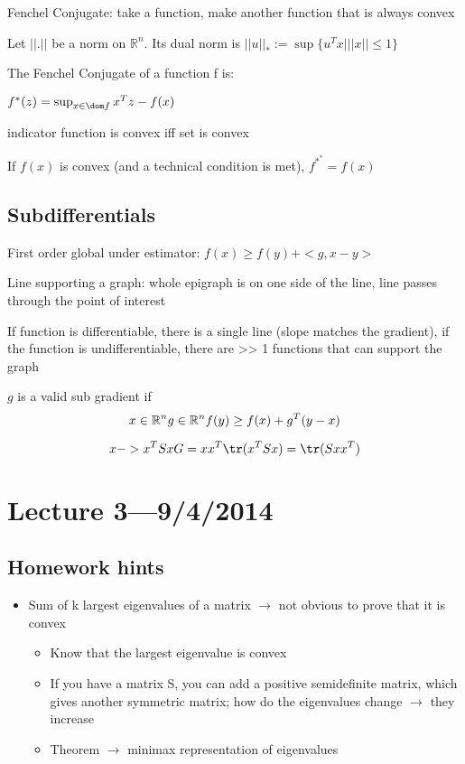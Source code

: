 \documentclass[10pt]{article}
\begin{document}
Fenchel Conjugate: take a function, make another function that is always convex

Let $||.||$ be a norm on $\mathbb{R}^n$. Its dual norm is $||u||_* := \sup \{ u^Tx | ||x|| \le 1 \}$

The Fenchel Conjugate of a function f is:

$f^*(z) = \sup_{x \in \dom f} x^T z - f(x)$

indicator function is convex iff set is convex

If $f(x)$ is convex (and a technical condition is met), $f^*^* = f(x)$

\subsection{Subdifferentials}

First order global under estimator: $f(x) \ge f(y) + <g, x - y>$

Line supporting a graph: whole epigraph is on one side of the line, line passes through the point of interest

If function is differentiable, there is a single line (slope matches the gradient), if the function is undifferentiable, there are >> 1 functions that can support the graph

$g$ is a valid sub gradient if 
$$
x \in \mathbb{R}^n \\
g \in \mathbb{R}^n \\
f(y) \ge f(x) + g^T(y - x)
$$

$$
x -> x^T S x \\
G = x x^T \\
\tr(x^T S x) = \tr(S x x^T)
$$

\section{Lecture 3---9/4/2014}

\subsection{Homework hints}

\begin{itemize}
\item Sum of k largest eigenvalues of a matrix $\rightarrow$ not obvious to prove that it is convex
\begin{itemize}
\item Know that the largest eigenvalue is convex
\item If you have a matrix S, you can add a positive semidefinite matrix, which gives another symmetric matrix; how do the eigenvalues change $\rightarrow$ they increase
\item Theorem $\rightarrow$ minimax representation of eigenvalues
\end{itemize}
\end{itemize}
\end{document}
